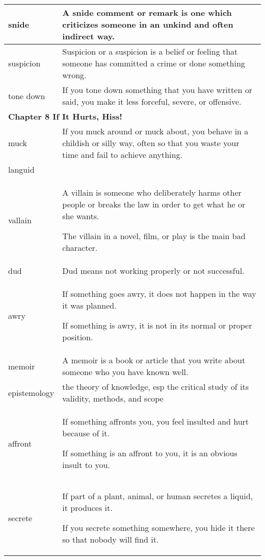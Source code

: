 \documentclass{article}
\begin{document}
\begin{center}
\begin{longtable}{|l|p{9cm}|}
\hline
snide
&
A snide comment or remark is one which criticizes someone in an unkind and often indirect way.
\\

\hline
suspicion
&
Suspicion or a suspicion is a belief or feeling that someone has committed a crime or done something wrong.
\\

\hline
tone down
&
If you tone down something that you have written or said, you make it less forceful, severe, or offensive.
\\

\hline
\multicolumn{2}{|l|}{\textbf{Chapter 8 If It Hurts, Hiss!}}\\

\hline
muck
&
If you muck around or muck about, you behave in a childish or silly way, often so that you waste your time and fail to achieve anything.
\\

\hline
languid
&

\\

\hline
vallain
&
A villain is someone who deliberately harms other people or breaks the law in order to get what he or she wants.
\par
The villain in a novel, film, or play is the main bad character.
\\

\hline
dud
&
Dud means not working properly or not successful.
\\

\hline
awry
&
If something goes awry, it does not happen in the way it was planned.
\par
If something is awry, it is not in its normal or proper position.
\\

\hline
memoir
&
A memoir is a book or article that you write about someone who you have known well.
\\

\hline
epistemology
&
the theory of knowledge, esp the critical study of its validity, methods, and scope
\\

\hline
affront
&
If something affronts you, you feel insulted and hurt because of it.
\par
If something is an affront to you, it is an obvious insult to you.
\\

\hline
secrete
&
If part of a plant, animal, or human secretes a liquid, it produces it.
\par
If you secrete something somewhere, you hide it there so that nobody will find it.
\\


\end{longtable}
\end{center}
\end{document}
